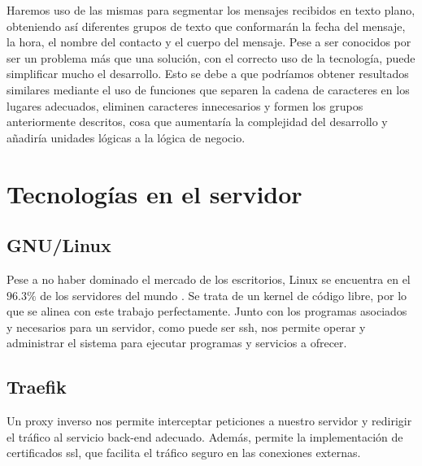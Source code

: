 Haremos uso de las mismas para segmentar los mensajes recibidos en texto plano, obteniendo así diferentes grupos de texto que conformarán la fecha del mensaje, la hora, el nombre del contacto y el cuerpo del mensaje. Pese a ser conocidos por ser un problema más que una solución, con el correcto uso de la tecnología, puede simplificar mucho el desarrollo. Esto se debe a que podríamos obtener resultados similares mediante el uso de funciones que separen la cadena de caracteres en los lugares adecuados, eliminen caracteres innecesarios y formen los grupos anteriormente descritos, cosa que aumentaría la complejidad del desarrollo y añadiría unidades lógicas a la lógica de negocio.


\section{Tecnologías en el servidor}
\label{tec_hab:server}

\begin{comment}
	Debido a la sencillez de nuestra lógica de negocio, no contamos con un back-end en el servidor, dado que únicamente servimos la aplicación al cliente. Una vez servida la aplicación, todas las operaciones se ejecutan en el cliente.
\end{comment}




\subsection{GNU/Linux}
\label{tec_hab:linux}

Pese a no haber dominado el mercado de los escritorios, Linux se encuentra en el $96.3\%$ de los servidores del mundo \cite{linuxMarketShare}. Se trata de un kernel de código libre, por lo que se alinea con este trabajo perfectamente. Junto con los programas asociados y necesarios para un servidor, como puede ser \acrshort{ssh}, nos permite operar y administrar el sistema para ejecutar programas y servicios a ofrecer.


\subsection{Traefik}
\label{tec_hab:traefik}

Un proxy inverso nos permite interceptar peticiones a nuestro servidor y redirigir el tráfico al servicio back-end adecuado. Además, permite la implementación de certificados \acrshort{ssl}, que facilita el tráfico seguro en las conexiones externas.

